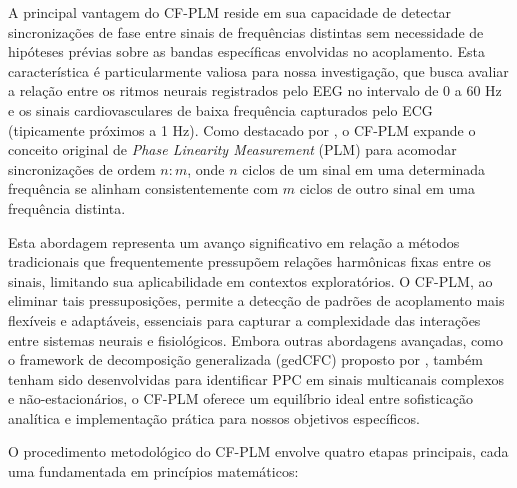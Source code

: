 A principal vantagem do CF-PLM reside em sua capacidade de detectar sincronizações de fase entre sinais de frequências distintas sem necessidade de hipóteses prévias sobre as bandas específicas envolvidas no acoplamento. Esta característica é particularmente valiosa para nossa investigação, que busca avaliar a relação entre os ritmos neurais registrados pelo EEG no intervalo de 0 a 60 Hz e os sinais cardiovasculares de baixa frequência capturados pelo ECG (tipicamente próximos a 1 Hz). Como destacado por , o CF-PLM expande o conceito original de \textit{Phase Linearity Measurement} (PLM) para acomodar sincronizações de ordem \(n:m\), onde \(n\) ciclos de um sinal em uma determinada frequência se alinham consistentemente com \(m\) ciclos de outro sinal em uma frequência distinta.

Esta abordagem representa um avanço significativo em relação a métodos tradicionais que frequentemente pressupõem relações harmônicas fixas entre os sinais, limitando sua aplicabilidade em contextos exploratórios. O CF-PLM, ao eliminar tais pressuposições, permite a detecção de padrões de acoplamento mais flexíveis e adaptáveis, essenciais para capturar a complexidade das interações entre sistemas neurais e fisiológicos. Embora outras abordagens avançadas, como o framework de decomposição generalizada (gedCFC) proposto por , também tenham sido desenvolvidas para identificar PPC em sinais multicanais complexos e não-estacionários, o CF-PLM oferece um equilíbrio ideal entre sofisticação analítica e implementação prática para nossos objetivos específicos.

O procedimento metodológico do CF-PLM envolve quatro etapas principais, cada uma fundamentada em princípios matemáticos:

